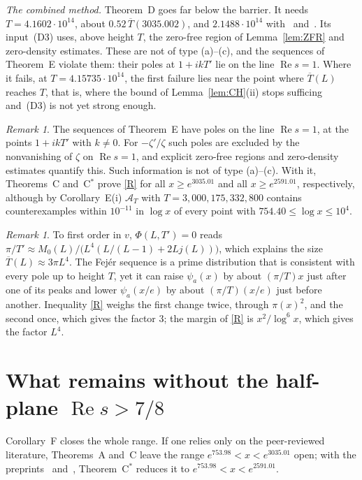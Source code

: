 \documentclass{amsart}
\theoremstyle{definition}
\theoremstyle{remark}
\newtheorem{remark}[theorem]{Remark}
\theoremstyle{plain}
\numberwithin{equation}{section}
\newcommand{\HRH}{3{,}000{,}175{,}332{,}800}
\newcommand{\cA}{\mathcal{A}}
\newcommand{\Tb}{\overline{T}}
\newcommand{\TDhyp}{4.1602\cdot10^{14}}
\newcommand{\TDpre}{2.1488\cdot10^{14}}
\newcommand{\Cstar}{C$^*$}
\begin{document}
\emph{The combined method.} Theorem~D goes far below the barrier. It needs $T=\TDhyp$, about $0.52\,\Tb(3035.002)$, and $\TDpre$ with~\cite{BTY26} and~\cite{Bel24}. Its input~(D3) uses, above height $T$, the zero-free region of Lemma~\ref{lem:ZFR} and zero-density estimates. These are not of type (a)--(c), and the sequences of Theorem~E violate them: their poles at $1+ikT'$ lie on the line $\operatorname{Re}s=1$. Where it fails, at $T=4.15735\cdot10^{14}$, the first failure lies near the point where $\Tb(L)$ reaches $T$, that is, where the bound of Lemma~\ref{lem:CH}(ii) stops sufficing and~(D3) is not yet strong enough.

\begin{remark}
The sequences of Theorem~E have poles on the line $\operatorname{Re}s=1$, at the points $1+ikT'$ with $k\ne0$. For $-\zeta'/\zeta$ such poles are excluded by the nonvanishing of $\zeta$ on $\operatorname{Re}s=1$, and explicit zero-free regions and zero-density estimates quantify this. Such information is not of type (a)--(c). With it, Theorems~C and~\Cstar{} prove \eqref{R} for all $x\ge e^{3035.01}$ and all $x\ge e^{2591.01}$, respectively, although by Corollary~E(i) $\cA_T$ with $T=\HRH$ contains counterexamples within $10^{-11}$ in $\log x$ of every point with $754.40\le\log x\le10^4$.
\end{remark}

\begin{remark}
To first order in $v$, $\Phi(L,T')=0$ reads $\pi/T'\approx M_0(L)/\bigl(L^4(L/(L-1)+2Lj(L))\bigr)$, which explains the size $\Tb(L)\approx3\pi L^4$. The Fej\'er sequence is a prime distribution that is consistent with every pole up to height $T$, yet it can raise $\psi_a(x)$ by about $(\pi/T)x$ just after one of its peaks and lower $\psi_a(x/e)$ by about $(\pi/T)(x/e)$ just before another. Inequality \eqref{R} weighs the first change twice, through $\pi(x)^2$, and the second once, which gives the factor $3$; the margin of \eqref{R} is $x^2/\log^6x$, which gives the factor $L^4$.
\end{remark}

\section{\texorpdfstring{What remains without the half-plane $\operatorname{Re}s>7/8$}{What remains without the half-plane Re s > 7/8}}\label{sec:gap}

Corollary~F closes the whole range. If one relies only on the peer-reviewed literature, Theorems~A and~C leave the range $e^{753.98}<x<e^{3035.01}$ open; with the preprints~\cite{BTY26} and~\cite{Bel24}, Theorem~\Cstar{} reduces it to $e^{753.98}<x<e^{2591.01}$.
\end{document}
